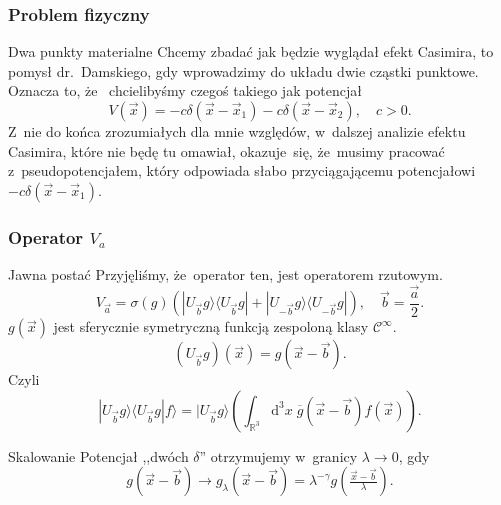 \documentclass{beamer} \mode<presentation>
\newcommand{\fr}{\frac}
\newcommand{\tfr}{\tfrac}
\newcommand{\ol}{\overline}
\newcommand{\mr}{\mathrm}
\newcommand{\mb}{\mathbb}
\newcommand{\mc}{\mathcal}
\newcommand{\ra}{\rightarrow}
\newcommand{\ga}{\gamma}
\newcommand{\del}{\delta}
\newcommand{\la}{\lambda}
\newcommand{\si}{\sigma}
\newcommand{\R}{\mb{R}}
\newcommand{\Cc}{\mc{C}}
\newcommand{\de}{\mr{d}}
\newcommand{\IntWie}[3]{ \int_{ #1 } \de^{ #2 }#3 \; } %
\newcommand{\Cinfty}{\Cc^{ \infty }}
\newcommand{\lket}{\langle}
\newcommand{\rket}{\rangle}
\newcommand{\veca}{\vec{ a }}
\newcommand{\vecb}{\vec{ b }}
\newcommand{\vecx}{\vec{ x }}
\newcommand{\red}[1]{{\color{red} #1}}
\begin{document}
\begin{frame}
  \frametitle{Problem fizyczny}

  \begin{block}{Dwa punkty materialne}
    Chcemy zbadać jak będzie wyglądał efekt Casimira, to pomysł
    dr.~Damskiego, gdy wprowadzimy do układu dwie cząstki punktowe. \\
    Oznacza to, że~\red{chcielibyśmy czegoś takiego jak potencjał}
    \begin{equation}
      \label{eq:EC04}
      V( \vecx ) = -c \del( \vecx - \vecx_{ 1 } ) - c \del( \vecx
      - \vecx_{ 2 } ),
      \quad c > 0.
    \end{equation}
    Z~nie do końca zrozumiałych dla mnie względów, w~dalszej analizie
    efektu Casimira, które nie będę tu omawiał, okazuje~się, że~musimy
    pracować z~pseudopotencjałem, który odpowiada słabo
    przyciągającemu potencjałowi $-c\del( \vecx - \vecx_{ 1 })$.
  \end{block}
  
\end{frame}



\begin{frame}
  \frametitle{Operator $V_{ a }$}

  \begin{block}{Jawna postać}
    Przyjęliśmy, że~operator ten, jest operatorem rzutowym.
    \begin{equation}
      \label{eq:EC05}
      V_{ \veca } = \si( g ) ( | U_{ \vecb } g \rket \lket U_{ \vecb } g |
      + | U_{ -\vecb } g \rket \lket U_{ -\vecb } g | ), \quad
      \vecb = \fr{ \veca }{ 2 }.
    \end{equation}
    $g( \vecx )$ jest sferycznie symetryczną funkcją zespoloną klasy
    $\Cinfty$.
    \begin{equation}
      \label{eq:EC06}
      (U_{ \vecb }g)( \vecx ) = g( \vecx - \vecb ).
    \end{equation}
    Czyli
    \begin{equation}
      \label{eq:EC07}
      | U_{ \vecb } g \rket \lket U_{ \vecb } g | f \rket
      = | U_{ \vecb } g \rket \left( \IntWie{ \R^{ 3 } }{ 3 }{ x }
        \ol{ g }( \vecx - \vecb ) f( \vecx ) \right).
    \end{equation}
  \end{block}

  \begin{block}{Skalowanie}
    Potencjał ,,dwóch $\del$'' otrzymujemy w~granicy $\la \ra 0$, gdy
    \begin{equation}
      \label{eq:EC08}
      g( \vecx - \vecb ) \ra g_{ \la }( \vecx - \vecb )
      = \la^{ -\ga } g( \tfr{ \vecx - \vecb }{ \la } ).
    \end{equation}
  \end{block}

\end{frame}
\end{document}
